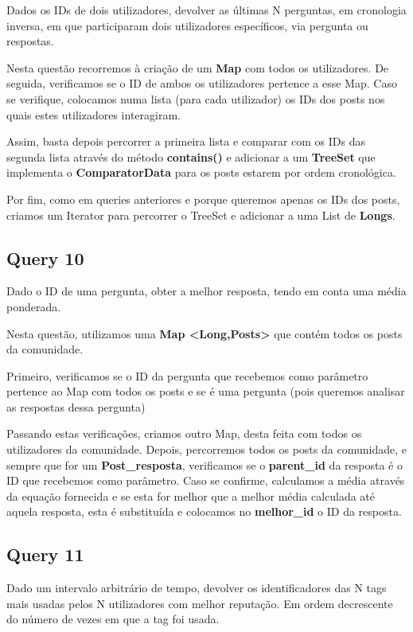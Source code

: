\documentclass[a4paper]{article}
\begin{document}
Dados os IDs de dois utilizadores, devolver as últimas N perguntas, em
cronologia inversa, em que participaram dois utilizadores específicos, 
via pergunta ou respostas.

Nesta questão recorremos à criação de um \textbf{Map} com todos os utilizadores. 
De seguida, verificamos se o ID de ambos os utilizadores pertence a esse Map.
Caso se verifique, colocamos numa lista (para cada utilizador) os IDs dos posts 
nos quais estes utilizadores interagiram.

Assim, basta depois percorrer a primeira lista e comparar com os IDs das segunda
lista através do método \textbf{contains()} e adicionar a um \textbf{TreeSet} que
implementa o \textbf{ComparatorData} para os posts estarem por ordem cronológica.

Por fim, como em queries anteriores e porque queremos apenas os IDs dos posts,
criamos um Iterator para percorrer o TreeSet e adicionar a uma List de \textbf{Longs}.

\subsection{Query 10}

Dado o ID de uma pergunta, obter a melhor resposta, tendo em conta
uma média ponderada.

Nesta questão, utilizamos uma \textbf{Map \textless Long,Posts\textgreater} 
que contém todos os posts da comunidade.

Primeiro, verificamos se o ID da pergunta que recebemos como parâmetro pertence ao
Map com todos os posts e se é uma pergunta (pois queremos analisar as respostas 
dessa pergunta)

Passando estas verificações, criamos outro Map, desta feita com todos os utilizadores
da comunidade. Depois, percorremos todos os posts da comunidade, e sempre que for um 
\textbf{Post\_resposta}, verificamos se o \textbf{parent\_id} da resposta é o ID que
recebemos como parâmetro. Caso se confirme, calculamos a média através da equação
fornecida e se esta for melhor que a melhor média calculada até aquela resposta, 
esta é substituída e colocamos no \textbf{melhor\_id} o ID da resposta.

\subsection{Query 11}

Dado um intervalo arbitrário de tempo, devolver os identificadores das N tags
mais usadas pelos N utilizadores com melhor reputação. Em ordem decrescente 
do número de vezes em que a tag foi usada.
\end{document}
